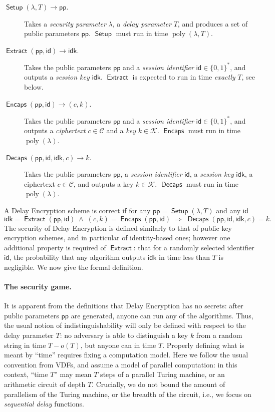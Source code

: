 \documentclass{llncs}
\DeclareMathOperator{\poly}{poly}
\DeclareMathOperator{\Setup}{\mathsf{Setup}}
\DeclareMathOperator{\Extract}{\mathsf{Extract}}
\DeclareMathOperator{\Encaps}{\mathsf{Encaps}}
\DeclareMathOperator{\Decaps}{\mathsf{Decaps}}
\newcommand{\pp}{\mathsf{pp}}
\newcommand{\id}{\mathsf{id}}
\newcommand{\idk}{\mathsf{idk}}
\newcommand{\keyspace}{\mathcal{K}}
\newcommand{\cipherspace}{\mathcal{C}}
\begin{document}
\begin{description}
\item[$\Setup(\lambda, T) \to \pp$.] %
  Takes a \emph{security parameter} $\lambda$, a \emph{delay
    parameter} $T$, and produces a set of public parameters $\pp$. %
  $\Setup$ must run in time $\poly(\lambda,T)$.
\item[$\Extract(\pp,\id) \to \idk$.] %
  Takes the public parameters $\pp$ and a \emph{session identifier}
  $\id\in\{0,1\}^*$, and outputs a \emph{session key} $\idk$. %
  $\Extract$ is expected to run in time \emph{exactly} $T$, see below.
\item[$\Encaps(\pp,\id)\to (c,k)$.] %
  Takes the public parameters $\pp$ and a \emph{session identifier}
  $\id\in\{0,1\}^*$, and outputs a \emph{ciphertext}
  $c\in\cipherspace$ and a \emph{key} $k\in\keyspace$. %
  $\Encaps$ must run in time $\poly(\lambda)$.
\item[$\Decaps(\pp,\id,\idk,c)\to k$.] %
  Takes the public parameters $\pp$, a \emph{session identifier}
  $\id$, a \emph{session key} $\idk$, a ciphertext $c\in\cipherspace$,
  and outputs a key $k\in\keyspace$. %
  $\Decaps$ must run in time $\poly(\lambda)$.
\end{description}

A Delay Encryption scheme is correct if for any
$\pp=\Setup(\lambda,T)$ and any $\id$
\[\idk=\Extract(\pp,\id)
  \;\wedge\;
  (c,k) = \Encaps(\pp,\id)
  \;\Rightarrow\;
  \Decaps(\pp,\id,\idk,c) = k.\]
The security of Delay Encryption is defined similarly to that of
public key encryption schemes, and in particular of identity-based
ones; however one additional property is required of $\Extract$: that
for a randomly selected identifier $\id$, the probability that any
algorithm outputs $\idk$ in time less than $T$ is negligible. %
We now give the formal definition.

\paragraph{The security game.} It is apparent from the definitions
that Delay Encryption has no secrets: after public parameters $\pp$
are generated, anyone can run any of the algorithms. %
Thus, the usual notion of indistinguishability will only be defined
with respect to the delay parameter $T$: no adversary is able to
distinguish a key $k$ from a random string in time $T-o(T)$, but
anyone can in time $T$. %
Properly defining what is meant by ``time'' requires fixing a
computation model. %
Here we follow the usual convention from VDFs, and assume a model of
parallel computation: in this context, ``time $T$'' may mean $T$ steps
of a parallel Turing machine, or an arithmetic circuit of depth $T$. %
Crucially, we do not bound the amount of parallelism of the Turing
machine, or the breadth of the circuit, i.e., we focus on
\emph{sequential delay} functions.
\end{document}

